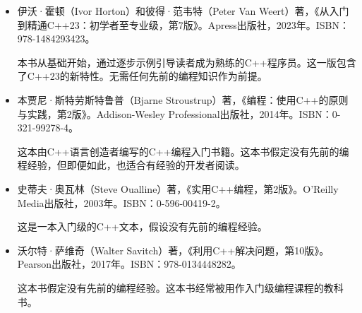 


\begin{itemize}
\item
伊沃·霍顿（Ivor Horton）和彼得·范韦特（Peter Van Weert）著，《从入门到精通C++23：初学者至专业级，第7版》。Apress出版社，2023年。ISBN：978-1484293423。

\hspace*{\fill}

本书从基础开始，通过逐步示例引导读者成为熟练的C++程序员。这一版包含了C++23的新特性。无需任何先前的编程知识作为前提。

\hspace*{\fill}

\item
本贾尼·斯特劳斯特鲁普（Bjarne Stroustrup）著，《编程：使用C++的原则与实践，第2版》。Addison-Wesley Professional出版社，2014年。ISBN：0-321-99278-4。

\hspace*{\fill}

这本由C++语言创造者编写的C++编程入门书籍。这本书假定没有先前的编程经验，但即便如此，也适合有经验的开发者阅读。

\hspace*{\fill}

\item
史蒂夫·奥瓦林（Steve Oualline）著，《实用C++编程，第2版》。O'Reilly Media出版社，2003年。ISBN：0-596-00419-2。

\hspace*{\fill}

这是一本入门级的C++文本，假设没有先前的编程经验。

\hspace*{\fill}

\item
沃尔特·萨维奇（Walter Savitch）著，《利用C++解决问题，第10版》。Pearson出版社，2017年。ISBN：978-0134448282。

\hspace*{\fill}

这本书假定没有先前的编程经验。这本书经常被用作入门级编程课程的教科书。
\end{itemize}


